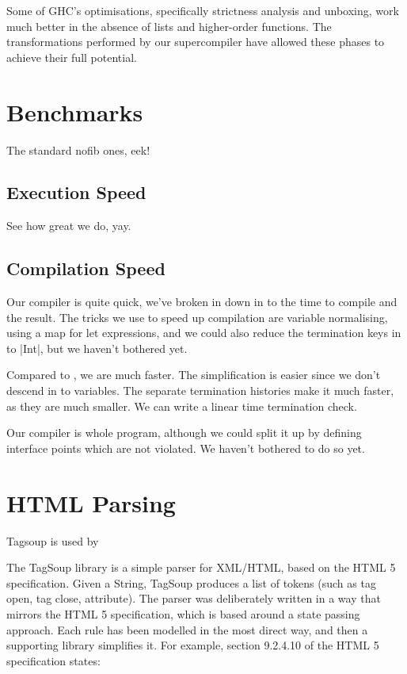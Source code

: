\documentclass[draft]{sigplanconf}
\begin{document}
Some of GHC's optimisations, specifically strictness analysis and unboxing, work much better in the absence of lists and higher-order functions. The transformations performed by our supercompiler have allowed these phases to achieve their full potential.

\section{Benchmarks}
\label{sec:benchmarks}


The standard nofib ones, eek!

\subsection{Execution Speed}

See how great we do, yay.

\subsection{Compilation Speed}

Our compiler is quite quick, we've broken in down in to the time to compile and the result. The tricks we use to speed up compilation are variable normalising, using a map for let expressions, and we could also reduce the termination keys in to |Int|, but we haven't bothered yet.

Compared to \cite{me:ifl2007post}, we are much faster. The simplification is easier since we don't descend in to variables. The separate termination histories make it much faster, as they are much smaller. We can write a linear time termination check.

Our compiler is whole program, although we could split it up by defining interface points which are not violated. We haven't bothered to do so yet.

\section{HTML Parsing}
\label{sec:tagsoup}


Tagsoup is used by \cite{malde:using_tagsoup}

The TagSoup library \cite{tagsoup} is a simple parser for XML/HTML, based on the HTML 5 specification. Given a String, TagSoup produces a list of tokens (such as tag open, tag close, attribute). The parser was deliberately written in a way that mirrors the HTML 5 specification, which is based around a state passing approach. Each rule has been modelled in the most direct way, and then a supporting library simplifies it. For example, section 9.2.4.10 of the HTML 5 specification states:
\end{document}

